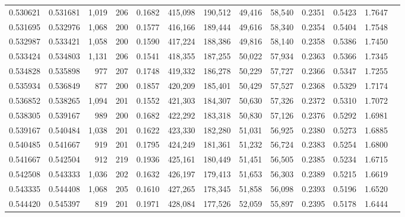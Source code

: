 \begin{tabular}{rrrrrrrrrrrrr}
0.530621 & 0.531681 &  1,019 &   206 &                                     0.1682 & 415,098 & 190,512 &  49,416 &  58,540 & 0.2351 & 0.5423 & 1.7647 \\
0.531695 & 0.532976 &  1,068 &   200 &                                     0.1577 & 416,166 & 189,444 &  49,616 &  58,340 & 0.2354 & 0.5404 & 1.7548 \\
0.532987 & 0.533421 &  1,058 &   200 &                                     0.1590 & 417,224 & 188,386 &  49,816 &  58,140 & 0.2358 & 0.5386 & 1.7450 \\
0.533424 & 0.534803 &  1,131 &   206 &                                     0.1541 & 418,355 & 187,255 &  50,022 &  57,934 & 0.2363 & 0.5366 & 1.7345 \\
0.534828 & 0.535898 &    977 &   207 &                                     0.1748 & 419,332 & 186,278 &  50,229 &  57,727 & 0.2366 & 0.5347 & 1.7255 \\
0.535934 & 0.536849 &    877 &   200 &                                     0.1857 & 420,209 & 185,401 &  50,429 &  57,527 & 0.2368 & 0.5329 & 1.7174 \\
0.536852 & 0.538265 &  1,094 &   201 &                                     0.1552 & 421,303 & 184,307 &  50,630 &  57,326 & 0.2372 & 0.5310 & 1.7072 \\
0.538305 & 0.539167 &    989 &   200 &                                     0.1682 & 422,292 & 183,318 &  50,830 &  57,126 & 0.2376 & 0.5292 & 1.6981 \\
0.539167 & 0.540484 &  1,038 &   201 &                                     0.1622 & 423,330 & 182,280 &  51,031 &  56,925 & 0.2380 & 0.5273 & 1.6885 \\
0.540485 & 0.541667 &    919 &   201 &                                     0.1795 & 424,249 & 181,361 &  51,232 &  56,724 & 0.2383 & 0.5254 & 1.6800 \\
0.541667 & 0.542504 &    912 &   219 &                                     0.1936 & 425,161 & 180,449 &  51,451 &  56,505 & 0.2385 & 0.5234 & 1.6715 \\
0.542508 & 0.543333 &  1,036 &   202 &                                     0.1632 & 426,197 & 179,413 &  51,653 &  56,303 & 0.2389 & 0.5215 & 1.6619 \\
0.543335 & 0.544408 &  1,068 &   205 &                                     0.1610 & 427,265 & 178,345 &  51,858 &  56,098 & 0.2393 & 0.5196 & 1.6520 \\
0.544420 & 0.545397 &    819 &   201 &                                     0.1971 & 428,084 & 177,526 &  52,059 &  55,897 & 0.2395 & 0.5178 & 1.6444 \\

\end{tabular}
